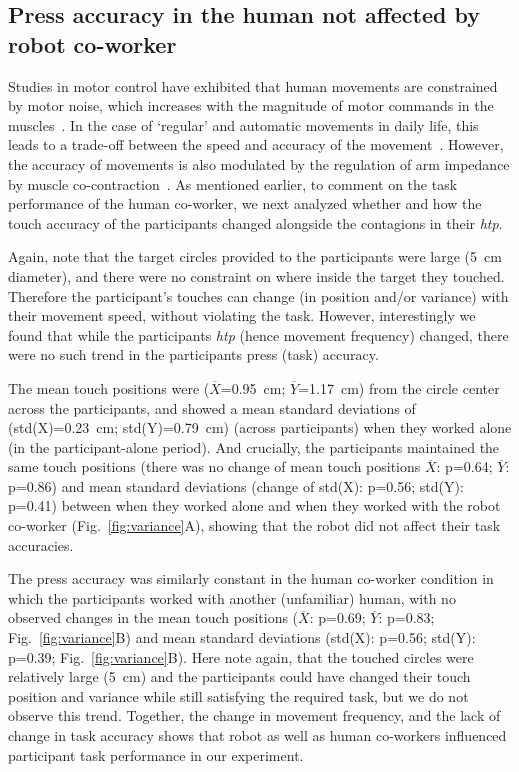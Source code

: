 \documentclass[a4paper, 12pt, oneside]{Thesis}  %
\begin{document}
\subsection{Press accuracy in the human not affected by robot co-worker}

Studies in motor control have exhibited that human movements are constrained by motor noise, which increases with the magnitude of motor commands in the muscles~\cite{Harris:Nature:1998}. In the case of `regular' and automatic movements in daily life, this leads to a trade-off between the speed and accuracy of the movement~\cite{Fitts:JEP:1954}. However, the accuracy of movements is also modulated by the regulation of arm impedance by muscle co-contraction~\cite{Burdet:nature:2001, Franklin:JoN:2008, Ganesh:RAS:2013}. As mentioned earlier, to comment on the task performance of the human co-worker, we next analyzed whether and how the touch accuracy of the participants changed alongside the contagions in their {\it htp}. 

Again, note that the target circles provided to the participants were large (5~cm diameter), and there were no constraint on where inside the target they touched. Therefore the participant's touches can change (in position and/or variance) with their movement speed, without violating the task. However, interestingly we found that while the participants {\it htp} (hence movement frequency) changed, there were no such trend in the participants press (task) accuracy. 

The mean touch positions were ($\overline{X}$=0.95~cm; $\overline{Y}$=1.17~cm) from the circle center across the participants, and showed a mean standard deviations of (std(X)=0.23~cm; std(Y)=0.79~cm) (across participants) when they worked alone (in the participant-alone period). And crucially, the participants maintained the same touch positions (there was no change of mean touch positions $\overline{X}$: p=0.64; $\overline{Y}$: p=0.86) and mean standard deviations (change of std(X): p=0.56; std(Y): p=0.41) between when they worked alone and when they worked with the robot co-worker (Fig.~\ref{fig:variance}A), showing that the robot did not affect their task accuracies.

The press accuracy was similarly constant in the human co-worker condition in which the participants worked with another (unfamiliar) human, with no observed changes in the mean touch positions ($\overline{X}$: p=0.69; $\overline{Y}$: p=0.83; Fig.~\ref{fig:variance}B) and mean standard deviations (std(X): p=0.56; std(Y): p=0.39; Fig.~\ref{fig:variance}B). Here note again, that the touched circles were relatively large (5~cm) and the participants could have changed their touch position and variance while still satisfying the required task, but we do not observe this trend. Together, the change in movement frequency, and the lack of change in task accuracy shows that robot as well as human co-workers influenced participant task performance in our experiment.
\end{document}
